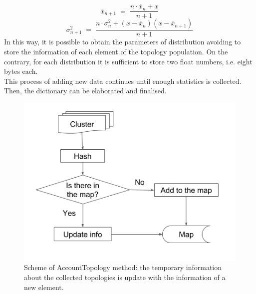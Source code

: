 \begin{equation}
 \overline{x}_{n + 1} \; = \; \frac{n \cdot \overline{x}_n + x}{n + 1}
\end{equation}
\begin{equation}
 \sigma^2_{n + 1} \; = \; \frac{n \cdot \sigma^2_n + (x - \overline{x}_n)(x - \overline{x}_{n + 1})}{n + 1}
\end{equation}
In this way, it is possible to obtain the parameters of distribution avoiding to store the information of each element of the topology population. On the contrary, for each distribution it is sufficient to store two float numbers, i.e. eight bytes each.\\
This process of adding new data continues until enough statistics is collected. Then, the dictionary can be elaborated and finalised.\\
%
\begin{figure}
  \centering
  \includegraphics[scale=0.6]{figures/account.png}
  \caption{Scheme of AccountTopology method: the temporary information about the collected topologies is update with the information of a new element.}
  \label{fig:account}
\end{figure}
%
